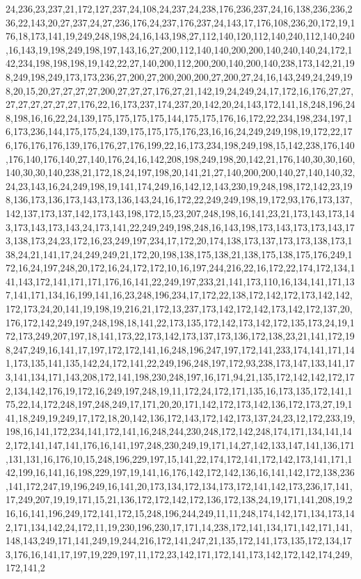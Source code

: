 24,236,23,237,21,172,127,237,24,108,24,237,24,238,176,236,237,24,16,138,236,236,236,22,143,20,27,237,24,27,236,176,24,237,176,237,24,143,17,176,108,236,20,172,19,176,18,173,141,19,249,248,198,24,16,143,198,27,112,140,120,112,140,240,112,140,240,16,143,19,198,249,198,197,143,16,27,200,112,140,140,200,200,140,240,140,24,172,142,234,198,198,198,19,142,22,27,140,200,112,200,200,140,200,140,238,173,142,21,198,249,198,249,173,173,236,27,200,27,200,200,200,27,200,27,24,16,143,249,24,249,198,20,15,20,27,27,27,27,200,27,27,27,176,27,21,142,19,24,249,24,17,172,16,176,27,27,27,27,27,27,27,27,176,22,16,173,237,174,237,20,142,20,24,143,172,141,18,248,196,248,198,16,16,22,24,139,175,175,175,175,144,175,175,176,16,172,22,234,198,234,197,16,173,236,144,175,175,24,139,175,175,175,176,23,16,16,24,249,249,198,19,172,22,176,176,176,176,139,176,176,27,176,199,22,16,173,234,198,249,198,15,142,238,176,140,176,140,176,140,27,140,176,24,16,142,208,198,249,198,20,142,21,176,140,30,30,160,140,30,30,140,238,21,172,18,24,197,198,20,141,21,27,140,200,200,140,27,140,140,32,24,23,143,16,24,249,198,19,141,174,249,16,142,12,143,230,19,248,198,172,142,23,198,136,173,136,173,143,173,136,143,24,16,172,22,249,249,198,19,172,93,176,173,137,142,137,173,137,142,173,143,198,172,15,23,207,248,198,16,141,23,21,173,143,173,143,173,143,173,143,24,173,141,22,249,249,198,248,16,143,198,173,143,173,173,143,173,138,173,24,23,172,16,23,249,197,234,17,172,20,174,138,173,137,173,173,138,173,138,24,21,141,17,24,249,249,21,172,20,198,138,175,138,21,138,175,138,175,176,249,172,16,24,197,248,20,172,16,24,172,172,10,16,197,244,216,22,16,172,22,174,172,134,141,143,172,141,171,171,176,16,141,22,249,197,233,21,141,173,110,16,134,141,171,137,141,171,134,16,199,141,16,23,248,196,234,17,172,22,138,172,142,172,173,142,142,172,173,24,20,141,19,198,19,216,21,172,13,237,173,142,172,142,173,142,172,137,20,176,172,142,249,197,248,198,18,141,22,173,135,172,142,173,142,172,135,173,24,19,172,173,249,207,197,18,141,173,22,173,142,173,137,173,136,172,138,23,21,141,172,198,247,249,16,141,17,197,172,172,141,16,248,196,247,197,172,141,233,174,141,171,141,173,135,141,135,142,24,172,141,22,249,196,248,197,172,93,238,173,147,133,141,173,141,134,171,143,208,172,141,198,230,248,197,16,171,94,21,135,172,142,142,172,172,134,142,176,19,172,16,249,197,248,19,11,172,24,172,171,135,16,173,135,172,141,175,22,14,172,248,197,248,249,17,171,20,20,171,142,172,173,142,136,172,173,27,19,141,18,249,19,249,17,172,18,20,142,136,172,143,172,142,173,137,24,23,12,172,233,19,198,16,141,172,234,141,172,141,16,248,244,230,248,172,142,248,174,171,134,141,142,172,141,147,141,176,16,141,197,248,230,249,19,171,14,27,142,133,147,141,136,171,131,131,16,176,10,15,248,196,229,197,15,141,22,174,172,141,172,142,173,141,171,142,199,16,141,16,198,229,197,19,141,16,176,142,172,142,136,16,141,142,172,138,236,141,172,247,19,196,249,16,141,20,173,134,172,134,173,172,141,142,173,236,17,141,17,249,207,19,19,171,15,21,136,172,172,142,172,136,172,138,24,19,171,141,208,19,216,16,141,196,249,172,141,172,15,248,196,244,249,11,11,248,174,142,171,134,173,142,171,134,142,24,172,11,19,230,196,230,17,171,14,238,172,141,134,171,142,171,141,148,143,249,171,141,249,19,244,216,172,141,247,21,135,172,141,173,135,172,134,173,176,16,141,17,197,19,229,197,11,172,23,142,171,172,141,173,142,172,142,174,249,172,141,2